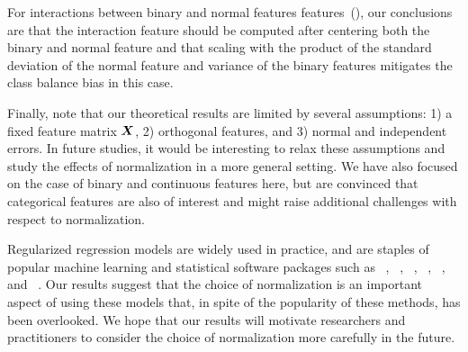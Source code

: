 For interactions between binary and normal features
features~(), our conclusions are that the interaction
feature should be computed after centering both the binary and normal feature and that
scaling with the product of the standard deviation of the normal feature and variance of
the binary features mitigates the class balance bias in this case.

Finally, note that our theoretical results are limited by several assumptions: 1) a fixed
feature matrix \(\boldsymbol{X}\), 2) orthogonal features, and 3) normal and independent errors.
In future studies, it would be interesting to relax these assumptions and study the effects
of normalization in a more general setting. We have also focused on the case of binary and
continuous features here, but are convinced that categorical features are also of interest
and might raise additional challenges with respect to normalization.

Regularized regression models are widely used in practice, and are staples of popular
machine learning and statistical software packages such as
~\citep{friedman2010}, ~\citep{pedregosa2011},
~\citep{curtin2023}, ~\citep{bertrand2022},
~\citep{fan2008a}, and ~\citep{themathworksinc.2022}. Our
results suggest that the choice of normalization is an important aspect of using these
models that, in spite of the popularity of these methods, has been overlooked. We hope that
our results will motivate researchers and practitioners to consider the choice of
normalization more carefully in the future.
